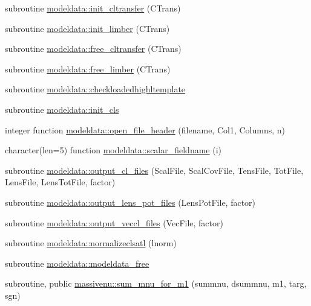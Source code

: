 \begin{DoxyCompactItemize}
\item 
subroutine \mbox{\hyperlink{namespacemodeldata_aafb7870d44b0d4146bad72673d70223f}{modeldata\+::init\+\_\+cltransfer}} (C\+Trans)
\item 
subroutine \mbox{\hyperlink{namespacemodeldata_af9818c2b8e3f5e17f6d1a309726fc12e}{modeldata\+::init\+\_\+limber}} (C\+Trans)
\item 
subroutine \mbox{\hyperlink{namespacemodeldata_a2d6ecb98a3edf71d3e3ed3ee1ffb82d1}{modeldata\+::free\+\_\+cltransfer}} (C\+Trans)
\item 
subroutine \mbox{\hyperlink{namespacemodeldata_a89ab0d30547c35685982ecf01d7145bd}{modeldata\+::free\+\_\+limber}} (C\+Trans)
\item 
subroutine \mbox{\hyperlink{namespacemodeldata_a031eb48cced394c893960d706797a651}{modeldata\+::checkloadedhighltemplate}}
\item 
subroutine \mbox{\hyperlink{namespacemodeldata_a3b4fcde7e9343acbea6dd3d7b52aba10}{modeldata\+::init\+\_\+cls}}
\item 
integer function \mbox{\hyperlink{namespacemodeldata_abab5acd24b50e4d884e84682fed17a52}{modeldata\+::open\+\_\+file\+\_\+header}} (filename, Col1, Columns, n)
\item 
character(len=5) function \mbox{\hyperlink{namespacemodeldata_af3439e8b84f5875f131343636aa8adee}{modeldata\+::scalar\+\_\+fieldname}} (i)
\item 
subroutine \mbox{\hyperlink{namespacemodeldata_ace30b2a5cf368aaadfbdaf70dcc20a9e}{modeldata\+::output\+\_\+cl\+\_\+files}} (Scal\+File, Scal\+Cov\+File, Tens\+File, Tot\+File, Lens\+File, Lens\+Tot\+File, factor)
\item 
subroutine \mbox{\hyperlink{namespacemodeldata_a3db0a7cfe521f110aeef7aaa900d1843}{modeldata\+::output\+\_\+lens\+\_\+pot\+\_\+files}} (Lens\+Pot\+File, factor)
\item 
subroutine \mbox{\hyperlink{namespacemodeldata_a307b673f582637ddd1d7c8557429e040}{modeldata\+::output\+\_\+veccl\+\_\+files}} (Vec\+File, factor)
\item 
subroutine \mbox{\hyperlink{namespacemodeldata_aec1c8c9bdd2a65d1f5eec6cb91f7afa1}{modeldata\+::normalizeclsatl}} (lnorm)
\item 
subroutine \mbox{\hyperlink{namespacemodeldata_a4a66d258c52f2b7639e92ce04f7047ff}{modeldata\+::modeldata\+\_\+free}}
\item 
subroutine, public \mbox{\hyperlink{namespacemassivenu_a872d62098a8fc9b6d372d05bc210c428}{massivenu\+::sum\+\_\+mnu\+\_\+for\+\_\+m1}} (summnu, dsummnu, m1, targ, sgn)

\end{DoxyCompactItemize}
